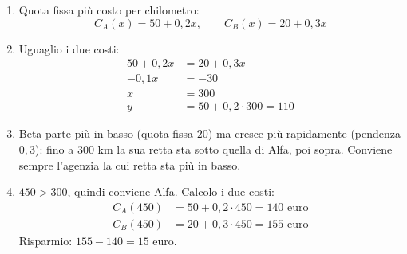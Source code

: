 \begin{question}[ID=4.4, subtitle={Noleggio auto: quale agenzia conviene}, difficulty=difficile, tags={sistemi, break-even, grafici}]
\begin{explanation}
\begin{enumerate}[label=\alph*),leftmargin=1.8cm]
    \item Quota fissa più costo per chilometro:
    \[ C_A(x)=50+0{,}2x, \qquad C_B(x)=20+0{,}3x \]
    \item Uguaglio i due costi:
    \[\begin{aligned}
    50+0{,}2x &= 20+0{,}3x\\
    -0{,}1x &= -30\\
    x &= 300\\
    y &= 50+0{,}2\cdot300=110
    \end{aligned}\]
    \item Beta parte più in basso (quota fissa $20$) ma cresce più rapidamente (pendenza $0{,}3$): fino a $300$ km la sua retta sta sotto quella di Alfa, poi sopra. Conviene sempre l'agenzia la cui retta sta più in basso.
    \item $450>300$, quindi conviene Alfa. Calcolo i due costi:
    \[\begin{aligned}
    C_A(450) &= 50+0{,}2\cdot450=140 \text{ euro}\\
    C_B(450) &= 20+0{,}3\cdot450=155 \text{ euro}
    \end{aligned}\]
    Risparmio: $155-140=15$ euro.
\end{enumerate}
\end{explanation}
\end{question}


